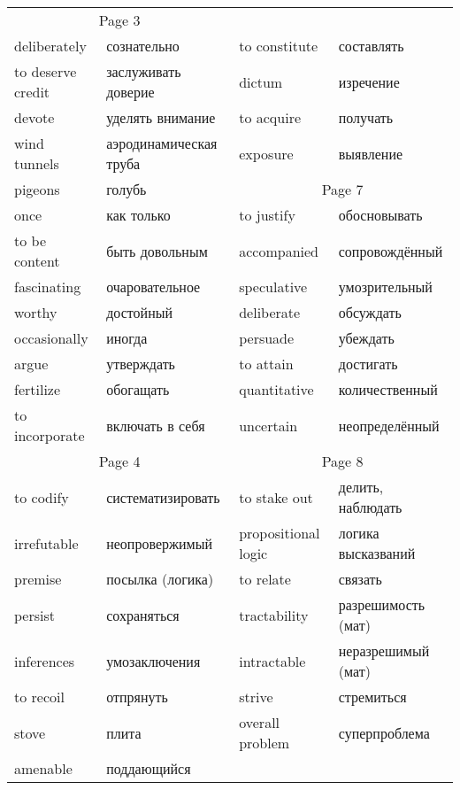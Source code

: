 \documentclass[12pt]{article}
\begin{document}
\begin{tabular}{| l l | l l | }
  \multicolumn{2}{c|}{Page 3} \\
  deliberately & сознательно & to constitute & составлять \\
  to deserve credit & заслуживать доверие & dictum & изречение \\
  devote & уделять внимание & to acquire & получать \\
  wind tunnels & аэродинамическая труба & exposure & выявление \\ \cline{3-4}
  pigeons & голубь & \multicolumn{2}{c|}{Page 7} \\
  once & как только & to justify & обосновывать \\
  to be content & быть довольным & accompanied & сопровождённый \\
  fascinating & очаровательное & speculative  & умозрительный \\
  worthy & достойный & deliberate & обсуждать \\
  occasionally & иногда & persuade & убеждать \\
  argue & утверждать & to attain & достигать \\
  fertilize  & обогащать & quantitative & количественный \\
  to incorporate  & включать в себя & uncertain & неопределённый \\ \hline

  \multicolumn{2}{c|}{Page 4} &  \multicolumn{2}{c|}{Page 8} \\
  to codify & систематизировать & to stake out & делить, наблюдать \\
  irrefutable & неопровержимый & propositional logic & логика высказваний \\
  premise & посылка (логика) & to relate & связать \\
  persist & сохраняться & tractability & разрешимость (мат) \\
  inferences & умозаключения & intractable & неразрешимый (мат) \\
  to recoil & отпрянуть & strive & стремиться \\
  stove & плита & overall problem & суперпроблема \\
  amenable & поддающийся & & \\
  \hline

\end{tabular}
\end{document}
